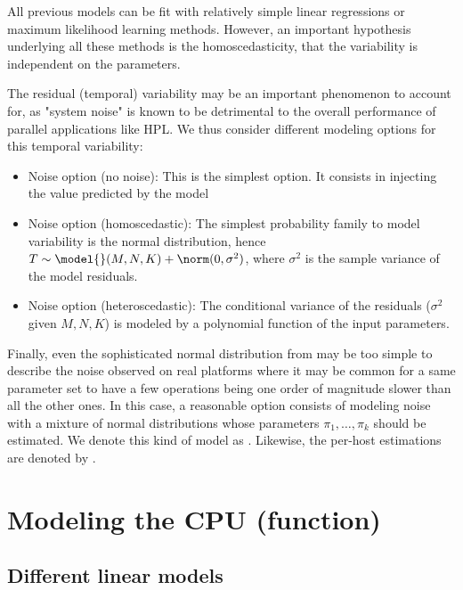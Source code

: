         All previous models can be fit with relatively simple linear regressions or maximum likelihood learning methods.
        However, an important hypothesis underlying all these methods is the homoscedasticity, \ie that the variability
        is independent on the parameters.

        The residual (temporal) variability may be an important phenomenon to account for, as "system noise" is known to
        be detrimental to the overall performance of parallel applications like HPL. We thus consider different modeling
        options for this temporal variability:
        \begin{itemize}
            \item Noise option  (no noise): This is the simplest option. It consists in injecting the value
                predicted by the model
            \item Noise option  (homoscedastic): The simplest probability family to model variability is the
                normal distribution, hence \(T \sim \model{}(M,N,K) + \norm(0,\sigma^2)\), where \(\sigma^2\) is the
                sample variance of the model residuals.
            \item Noise option  (heteroscedastic): The conditional variance of the residuals (\ie \(\sigma^2\)
                given \(M,N,K\)) is modeled by a polynomial function of the input parameters.
        \end{itemize}
        Finally, even the sophisticated normal distribution from  may be too simple to describe the noise
        observed on real platforms where it may be common for a same parameter set to have a few operations being one
        order of magnitude slower than all the other ones. In this case, a reasonable option consists of modeling noise
        with a mixture of normal distributions whose parameters \(\pi_1 , \dots, \pi_k\) should be estimated. We denote
        this kind of model as \noisep{}. Likewise, the per-host estimations are denoted by \noise[H]{}.

    \section{Modeling  the CPU (\ie \dgemm function)}
    \label{sec:dgemm_model}

        \subsection{Different linear models}%

